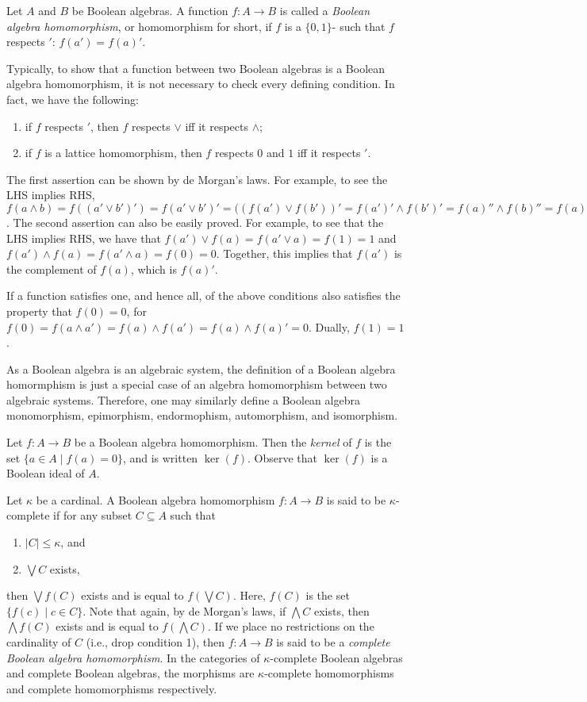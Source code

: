 \documentclass[12pt]{article}
\begin{document}
Let $A$ and $B$ be Boolean algebras.  A function $f:A\to B$ is called a \emph{Boolean algebra homomorphism}, or homomorphism for short, if $f$ is a $\lbrace 0,1\rbrace$- such that $f$ respects $'$: $f(a')=f(a)'$.  

Typically, to show that a function between two Boolean algebras is a Boolean algebra homomorphism, it is not necessary to check every defining condition.  In fact, we have the following:
\begin{enumerate}
\item if $f$ respects $'$, then $f$ respects $\vee$ iff it respects $\wedge$;
\item if $f$ is a lattice homomorphism, then $f$ respects $0$ and $1$ iff it respects $'$.
\end{enumerate}
The first assertion can be shown by de Morgan's laws.  For example, to see the LHS implies RHS, $f(a\wedge b)= f((a'\vee b')')= f(a'\vee b')'=((f(a')\vee f(b'))'= f(a')'\wedge f(b')'= f(a)'' \wedge f(b)'' = f(a)\wedge f(b)$.  The second assertion can also be easily proved.  For example, to see that the LHS implies RHS, we have that $f(a')\vee f(a)= f(a'\vee a)=f(1)=1$ and $f(a')\wedge f(a)=f(a'\wedge a)=f(0)=0$.  Together, this implies that $f(a')$ is the complement of $f(a)$, which is $f(a)'$.

If a function satisfies one, and hence all, of the above conditions also satisfies the property that $f(0)=0$, for $f(0)=f(a\wedge a')=f(a)\wedge f(a')= f(a)\wedge f(a)'=0$.  Dually, $f(1)=1$.

As a Boolean algebra is an algebraic system, the definition of a Boolean algebra homormphism is just a special case of an algebra homomorphism between two algebraic systems.  Therefore, one may similarly define a Boolean algebra monomorphism, epimorphism, endormophism, automorphism, and isomorphism.

Let $f:A\to B$ be a Boolean algebra homomorphism.  Then the \emph{kernel} of $f$ is the set $\lbrace a\in A\mid f(a)=0\rbrace$, and is written $\ker(f)$.  Observe that $\ker(f)$ is a Boolean ideal of $A$.

Let $\kappa$ be a cardinal.  A Boolean algebra homomorphism $f:A\to B$ is said to be $\kappa$-complete if for any subset $C\subseteq A$ such that 
\begin{enumerate}
\item $|C|\le \kappa$, and 
\item $\bigvee C$ exists, 
\end{enumerate}
then $\bigvee f(C)$ exists and is equal to $f(\bigvee C)$.  Here, $f(C)$ is the set $\lbrace f(c)\mid c\in C\rbrace$.  Note that again, by de Morgan's laws, if $\bigwedge C$ exists, then $\bigwedge f(C)$ exists and is equal to $f(\bigwedge C)$.  If we place no restrictions on the cardinality of $C$ (i.e., drop condition 1), then $f:A\to B$ is said to be a \emph{complete Boolean algebra homomorphism}.  In the categories of $\kappa$-complete Boolean algebras and complete Boolean algebras, the morphisms are $\kappa$-complete homomorphisms and complete homomorphisms respectively.
\end{document}
